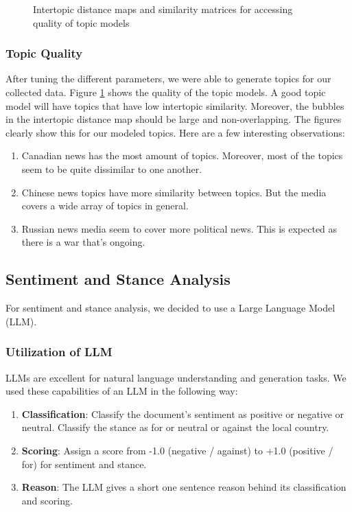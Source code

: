 \documentclass{article}
\theoremstyle{mytheoremstyle}
\theoremstyle{mytheoremstyle}
\theoremstyle{myproblemstyle}
\begin{document}
\begin{figure}[hp]
        \caption{Intertopic distance maps and similarity matrices for accessing quality of topic models}
        \label{fig:topic_model_quality}
    \end{figure}

    \subsubsection{Topic Quality}
    After tuning the different parameters, we were able to generate topics for our collected data. Figure \ref{fig:topic_model_quality} shows the quality of the topic models. A good topic model will have topics that have low intertopic similarity. Moreover, the bubbles in the intertopic distance map should be large and non-overlapping. The figures clearly show this for our modeled topics. Here are a few interesting observations:

    \begin{enumerate}
        \item Canadian news has the most amount of topics. Moreover, most of the topics seem to be quite dissimilar to one another.
        \item Chinese news topics have more similarity between topics. But the media covers a wide array of topics in general.
        \item Russian news media seem to cover more political news. This is expected as there is a war that's ongoing.
    \end{enumerate}

    \subsection{Sentiment and Stance Analysis}

    For sentiment and stance analysis, we decided to use a Large Language Model (LLM). 
    
    \subsubsection{Utilization of LLM}
    LLMs are excellent for natural language understanding and generation tasks. We used these capabilities of an LLM in the following way:

    \begin{enumerate}
        \item \textbf{Classification}: Classify the document's sentiment as positive or negative or neutral. Classify the stance as for or neutral or against the local country.
        \item \textbf{Scoring}: Assign a score from -1.0 (negative / against) to +1.0 (positive / for) for sentiment and stance.
        \item \textbf{Reason}: The LLM gives a short one sentence reason behind its classification and scoring.
    \end{enumerate}
\end{document}
